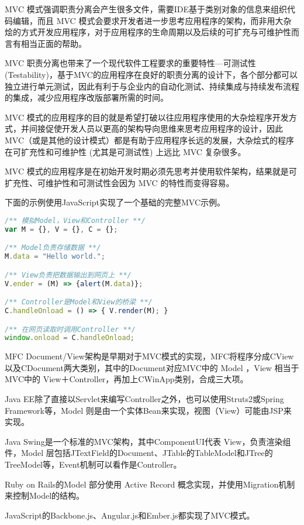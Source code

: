 MVC 模式强调职责分离会产生很多文件，需要IDE基于类别对象的信息来组织代码编辑，而且 MVC 模式会要求开发者进一步思考应用程序的架构，而非用大杂烩的方式开发应用程序，对于应用程序的生命周期以及后续的可扩充与可维护性而言有相当正面的帮助。

MVC 职责分离也带来了一个现代软件工程要求的重要特性—可测试性 (Testability)，基于MVC的应用程序在良好的职责分离的设计下，各个部分都可以独立进行单元测试，因此有利于与企业内的自动化测试、持续集成与持续发布流程的集成，减少应用程序改版部署所需的时间。

MVC 模式的应用程序的目的就是希望打破以往应用程序使用的大杂烩程序开发方式，并间接促使开发人员以更高的架构导向思维来思考应用程序的设计，因此MVC（或是其他的设计模式）都是有助于应用程序长远的发展，大杂烩式的程序在可扩充性和可维护性 (尤其是可测试性) 上远比 MVC 复杂很多。

MVC 模式的应用程序是在初始开发时期必须先思考并使用软件架构，结果就是可扩充性、可维护性和可测试性会因为 MVC 的特性而变得容易。

下面的示例使用JavaScript实现了一个基础的完整MVC示例。

\begin{lstlisting}[language=JavaScript]
/** 模拟Model，View和Controller **/
var M = {}, V = {}, C = {};

/** Model负责存储数据 **/
M.data = "Hello world.";

/** View负责把数据输出到网页上 **/
V.ender = (M) => {alert(M.data)};

/** Controller是Model和View的桥梁 **/
C.handleOnload = () => { V.render(M); }

/** 在网页读取时调用Controller **/
window.onload = C.handleOnload;
\end{lstlisting}

MFC Document/View架构是早期对于MVC模式的实现，MFC将程序分成CView以及CDocument两大类别，其中的Document对应MVC中的 Model ，View 相当于MVC中的 View＋Controller，再加上CWinApp类别，合成三大项。


Java EE除了直接以Servlet来编写Controller之外，也可以使用Struts2或Spring Framework等，Model 则是由一个实体Bean来实现，视图（View）可能由JSP来实现。

Java Swing是一个标准的MVC架构，其中ComponentUI代表 View，负责渲染组件，Model 层包括JTextField的Document、JTable的TableModel和JTree的TreeModel等，Event机制可以看作是Controller。

Ruby on Rails的Model 部分使用 Active Record 概念实现，并使用Migration机制来控制Model的结构。

JavaScript的Backbone.js、Angular.js和Ember.js都实现了MVC模式。

